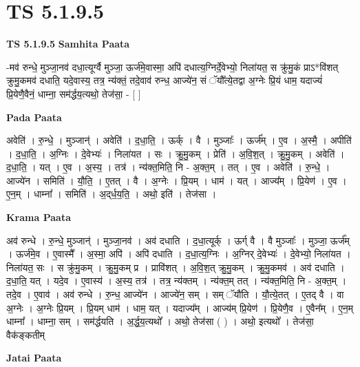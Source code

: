 \documentclass[17pt]{extarticle}
\begin{document}
\section{ TS 5.1.9.5 }

\textbf{TS 5.1.9.5 } \newline
\textbf{Samhita Paata} \newline

-मव॑ रुन्धे॒ मुञ्जा॒नव॑ दधा॒त्यूर्ग्वै मुञ्जा॒ ऊर्ज॑मे॒वास्मा॒ अपि॑ दधात्य॒ग्निर्दे॒वेभ्यो॒ निला॑यत॒ स क्रु॑मु॒कं प्राऽ*वि॑शत् क्रुमु॒कमव॑ दधाति॒ यदे॒वास्य॒ तत्र॒ न्य॑क्तं॒ तदे॒वाव॑ रुन्ध॒ आज्ये॑न॒ सं ॅयौ᳚त्ये॒तद्वा अ॒ग्नेः प्रि॒यं धाम॒ यदाज्यं॑ प्रि॒येणै॒वैनं॒ धाम्ना॒ सम॑र्द्धय॒त्यथो॒ तेज॑सा॒ - [  ] \newline

\textbf{Pada Paata} \newline

अवेति॑ । रु॒न्धे॒ । मुञ्जान्॑ । अवेति॑ । द॒धा॒ति॒ । ऊर्क् । वै । मुञ्जाः᳚ । ऊर्ज᳚म् । ए॒व । अ॒स्मै॒ । अपीति॑ । द॒धा॒ति॒ । अ॒ग्निः । दे॒वेभ्यः॑ । निला॑यत । सः । क्रु॒मु॒कम् । प्रेति॑ । अ॒वि॒श॒त् । क्रु॒मु॒कम् । अवेति॑ । द॒धा॒ति॒ । यत् । ए॒व । अ॒स्य॒ । तत्र॑ । न्य॑क्त॒मिति॒ नि - अ॒क्त॒म् । तत् । ए॒व । अवेति॑ । रु॒न्धे॒ । आज्ये॑न । समिति॑ । यौ॒ति॒ । ए॒तत् । वै । अ॒ग्नेः । प्रि॒यम् । धाम॑ । यत् । आज्य᳚म् । प्रि॒येण॑ । ए॒व । ए॒न॒म् । धाम्ना᳚ । समिति॑ । अ॒द्‌र्ध॒य॒ति॒ । अथो॒ इति॑ । तेज॑सा ।  \newline


\textbf{Krama Paata} \newline

अव॑ रुन्धे । रु॒न्धे॒ मुञ्जान्॑ । मुञ्जा॒नव॑ । अव॑ दधाति । द॒धा॒त्यूर्क् । ऊर्ग् वै । वै मुञ्जाः᳚ । मुञ्जा॒ ऊर्ज᳚म् । ऊर्ज॑मे॒व । ए॒वास्मै᳚ । अ॒स्मा॒ अपि॑ । अपि॑ दधाति । द॒धा॒त्य॒ग्निः । अ॒ग्निर् दे॒वेभ्यः॑ । दे॒वेभ्यो॒ निला॑यत । निला॑यत॒ सः । स क्रु॑मु॒कम् । क्रु॒मु॒कम् प्र । प्रावि॑शत् । अ॒वि॒श॒त् क्रु॒मु॒कम् । क्रु॒मु॒कमव॑ । अव॑ दधाति । द॒धा॒ति॒ यत् । यदे॒व । ए॒वास्य॑ । अ॒स्य॒ तत्र॑ । तत्र॒ न्य॑क्तम् । न्य॑क्त॒म् तत् । न्य॑क्त॒मिति॒ नि - अ॒क्त॒म् । तदे॒व । ए॒वाव॑ । अव॑ रुन्धे । रु॒न्ध॒ आज्ये॑न । आज्ये॑न॒ सम् । सम् ॅयौ॑ति । यौ॒त्ये॒तत् । ए॒तद् वै । वा अ॒ग्नेः । अ॒ग्नेः प्रि॒यम् । प्रि॒यम् धाम॑ । धाम॒ यत् । यदाज्य᳚म् । आज्य॑म् प्रि॒येण॑ । प्रि॒येणै॒व । ए॒वैन᳚म् । ए॒न॒म् धाम्ना᳚ । धाम्ना॒ सम् । सम॑र्द्धयति । अ॒र्द्ध॒य॒त्यथो᳚ । अथो॒ तेज॑सा ( ) । अथो॒ इत्यथो᳚ । तेज॑सा॒ वैक॑ङ्कतीम् \newline

\textbf{Jatai Paata} \newline
\end{document}
